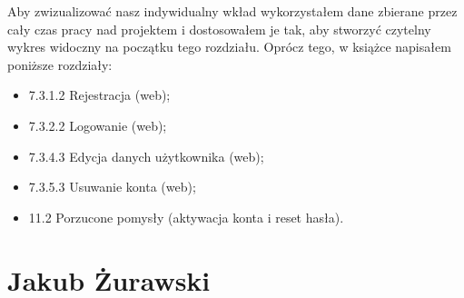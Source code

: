 Aby zwizualizować nasz indywidualny wkład wykorzystałem dane zbierane przez cały czas pracy nad projektem i
dostosowałem je tak, aby stworzyć czytelny wykres widoczny na początku tego rozdziału.
Oprócz tego, w książce napisałem poniższe rozdziały:

\begin{itemize}
    \item 7.3.1.2 Rejestracja (web);
    \item 7.3.2.2 Logowanie (web);
    \item 7.3.4.3 Edycja danych użytkownika (web);
    \item 7.3.5.3 Usuwanie konta (web);
    \item 11.2 Porzucone pomysły (aktywacja konta i reset hasła).
\end{itemize}

\section{Jakub Żurawski}

